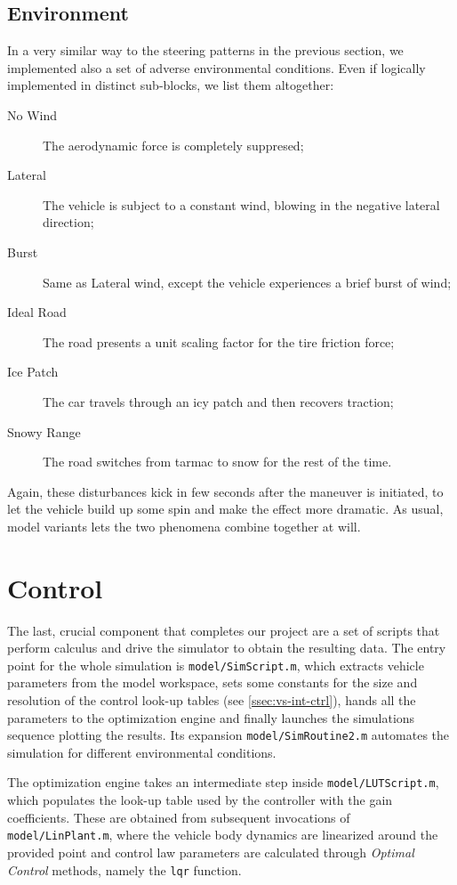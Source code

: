 		\subsection{Environment}

		In a very similar way to the steering patterns in the previous section, we implemented also a set of adverse environmental conditions.
		Even if logically implemented in distinct sub-blocks, we list them altogether:
		\begin{description}

			\item[No Wind] The aerodynamic force is completely suppresed;

			\item[Lateral] The vehicle is subject to a constant wind, blowing in the negative lateral direction;

			\item[Burst] Same as Lateral wind, except the vehicle experiences a brief burst of wind;

			\item[Ideal Road] The road presents a unit scaling factor for the tire friction force;

			\item[Ice Patch] The car travels through an icy patch and then recovers traction;

			\item[Snowy Range] The road switches from tarmac to snow for the rest of the time.

		\end{description}
		
		Again, these disturbances kick in few seconds after the maneuver is initiated, to let the vehicle build up some spin and make the effect more dramatic.
		As usual, model variants lets the two phenomena combine together at will.


	\section{Control}
	\label{sec:vs-ctrl}

	The last, crucial component that completes our project are a set of scripts that perform calculus and drive the simulator to obtain the resulting data.
	The entry point for the whole simulation is \texttt{model/SimScript.m}, which extracts vehicle parameters from the model workspace, sets some constants for the size and
	resolution of the control look-up tables (see \ref{ssec:vs-int-ctrl}), hands all the parameters to the optimization engine and finally launches the simulations sequence plotting
	the results. Its expansion \texttt{model/SimRoutine2.m} automates the simulation for different environmental conditions.
	
	The optimization engine takes an intermediate step inside \texttt{model/LUTScript.m}, which populates the look-up table used by the controller with the gain coefficients.
	These are obtained from subsequent invocations of \texttt{model/LinPlant.m}, where the vehicle body dynamics are linearized around the provided point and control law
	parameters are calculated through \emph{Optimal Control} methods, namely the \lstinline{lqr} \mwML{} function.